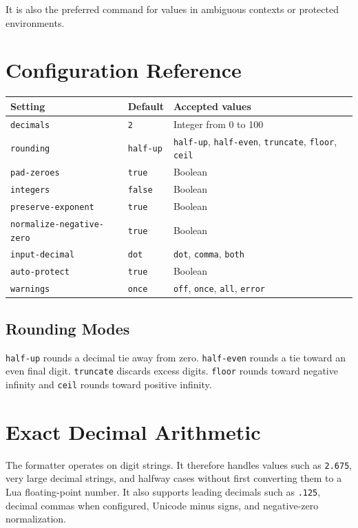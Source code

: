 \documentclass[11pt]{article}
\begin{document}
It is also the preferred command for values in ambiguous contexts or protected
environments.

\section{Configuration Reference}

\begin{center}
\begin{tabular}{@{}lll@{}}
\toprule
Setting & Default & Accepted values \\
\midrule
\texttt{decimals} & \texttt{2} & Integer from 0 to 100 \\
\texttt{rounding} & \texttt{half-up} & \texttt{half-up}, \texttt{half-even}, \texttt{truncate}, \texttt{floor}, \texttt{ceil} \\
\texttt{pad-zeroes} & \texttt{true} & Boolean \\
\texttt{integers} & \texttt{false} & Boolean \\
\texttt{preserve-exponent} & \texttt{true} & Boolean \\
\texttt{normalize-negative-zero} & \texttt{true} & Boolean \\
\texttt{input-decimal} & \texttt{dot} & \texttt{dot}, \texttt{comma}, \texttt{both} \\
\texttt{auto-protect} & \texttt{true} & Boolean \\
\texttt{warnings} & \texttt{once} & \texttt{off}, \texttt{once}, \texttt{all}, \texttt{error} \\
\bottomrule
\end{tabular}
\end{center}

\subsection{Rounding Modes}

\texttt{half-up} rounds a decimal tie away from zero. \texttt{half-even}
rounds a tie toward an even final digit. \texttt{truncate} discards excess
digits. \texttt{floor} rounds toward negative infinity and \texttt{ceil}
rounds toward positive infinity.

\section{Exact Decimal Arithmetic}

The formatter operates on digit strings. It therefore handles values such as
\texttt{2.675}, very large decimal strings, and halfway cases without first
converting them to a Lua floating-point number. It also supports leading
decimals such as \texttt{.125}, decimal commas when configured, Unicode minus
signs, and negative-zero normalization.
\end{document}
